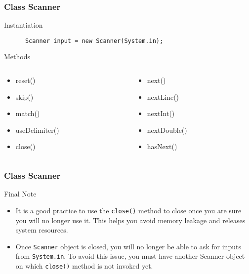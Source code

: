 \documentclass[10pt, compress]{beamer}
\begin{document}
\begin{frame}[fragile]
  \frametitle{Class Scanner}
  \begin{block}{Instantiation}
    \begin{verbatim}
      Scanner input = new Scanner(System.in);
    \end{verbatim}
  \end{block}
  \begin{block}{Methods}
    \begin{columns}
      \begin{column}{0.5\textwidth}
        \begin{itemize}
          \item[] reset()
          \item[] skip()
          \item[] match()
          \item[] useDelimiter()
          \item[] close()
        \end{itemize}
      \end{column}
      \begin{column}{0.5\textwidth}
        \begin{itemize}
          \item[] next()
          \item[] nextLine()
          \item[] nextInt()
          \item[] nextDouble()
          \item[] hasNext()
        \end{itemize}
      \end{column}
    \end{columns}
  \end{block}
\end{frame}

\begin{frame}[fragile]
  \frametitle{Class Scanner}
  \begin{block}{Final Note}
    \begin{itemize}
      \item[] It is a good practice to use the \texttt{close()} method to close once you are sure you will no longer use it. This helps you avoid memory leakage and releases system resources.
      \item[] Once \texttt{Scanner} object is closed, you will no longer be able to ask for inputs from \texttt{System.in}. To avoid this issue, you must have another Scanner object on which \texttt{close()} method is not invoked yet.
    \end{itemize}
  \end{block}
\end{frame}

\end{document}
